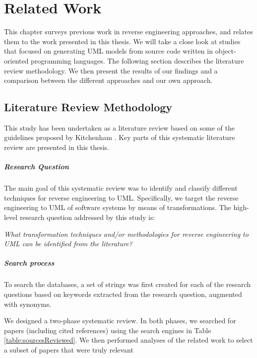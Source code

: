 \lhead{\emph{\leftmark}}  
\chapter{Related Work}
\label{chap:related}
This chapter surveys previous work in reverse engineering approaches, and relates them to the work presented in this thesis. We will take a close look at studies that focused on generating UML models from source code written in object-oriented programming languages.
The following section describes the literature review methodology. We then present the results of our findings and a comparison between the different approaches and our own approach. 

\section{Literature Review Methodology}

This study has been undertaken as a literature review based on some of the guidelines proposed by Kitchenham \cite{kitchenham2004procedures}. Key parts of this systematic literature review are presented in this thesis.

\paragraph*{Research Question}

The main goal of this systematic review was to identify and classify different techniques for reverse engineering to UML. Specifically, we target the reverse engineering to UML of software systems by means of transformations. The high-level research question addressed by this study is:

\textit{What transformation techniques and/or methodologies for reverse engineering to UML can be identified from the literature?}

\paragraph*{Search process}

To search the databases, a set of strings was first created for each of the research questions based on keywords extracted from the research question, augmented with synonyms.

We designed a two-phase systematic review. In both phases, we searched for papers (including cited references) using the search engines in Table \ref{table:sourcesReviewed}. We then performed analyses of the related work to select a subset of papers that were truly relevant

